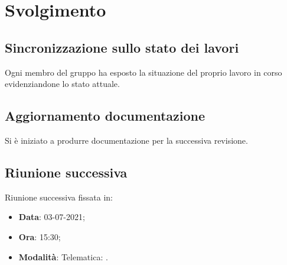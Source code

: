 \documentclass[]{article}
\begin{document}
	\newpage

	\section{Svolgimento}
		\subsection{Sincronizzazione sullo stato dei lavori}
		Ogni membro del gruppo ha esposto la situazione del proprio lavoro in corso evidenziandone lo stato attuale.\\
		
		\subsection{Aggiornamento documentazione}
		Si è iniziato a produrre documentazione per la successiva revisione.\\
		
		\subsection{Riunione successiva}
		Riunione successiva fissata in:
		\begin{itemize}
			\item \textbf{Data}: 03-07-2021;
			\item \textbf{Ora}: 15:30;
			\item \textbf{Modalità}: Telematica: .
		\end{itemize}
\end{document}

